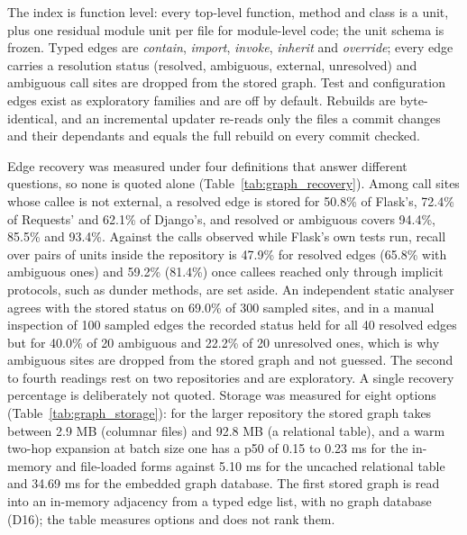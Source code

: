 \documentclass[10pt,twocolumn]{article}
\makeatletter
\renewcommand\section{\@startsection{section}{1}{\z@}{6pt}{3pt}{\normalfont\large\bfseries}}
\renewcommand\paragraph{\@startsection{paragraph}{4}{\z@}{3pt}{-0.5em}{\normalfont\bfseries}}
\makeatother
\begin{document}


\section{System}
\label{sec:system}

\paragraph{Parser and typed graph.} The index is function level: every top-level function, method
and class is a unit, plus one residual module unit per file for module-level code; the unit schema is
frozen. Typed edges are \emph{contain}, \emph{import}, \emph{invoke}, \emph{inherit} and
\emph{override}; every edge carries a resolution status (resolved, ambiguous, external,
unresolved) and ambiguous call sites are dropped from the stored graph. Test and configuration edges
exist as exploratory families and are off by default. Rebuilds are byte-identical, and an
incremental updater re-reads only the files a commit changes and their dependants and equals the
full rebuild on every commit checked.

Edge recovery was measured under four definitions that answer different questions, so none is quoted alone
(Table~\ref{tab:graph_recovery}). Among call sites whose callee is not external, a resolved edge is stored for 50.8\% of Flask's, 72.4\% of Requests'
and 62.1\% of Django's, and resolved or ambiguous covers 94.4\%, 85.5\% and 93.4\%. %
Against the calls observed while Flask's own tests run, recall over pairs of units inside the repository is 47.9\% for resolved edges (65.8\% with ambiguous ones) and
59.2\% (81.4\%) once callees reached only through implicit protocols, such as dunder methods, are set aside. %
An independent static analyser agrees with the stored status on 69.0\% of 300 sampled sites, and in a manual inspection of 100 sampled edges the recorded status held for
all 40 resolved edges but for 40.0\% of 20 ambiguous and 22.2\% of 20 unresolved ones, which is why ambiguous sites are dropped from the stored graph and not guessed. %
The second to fourth readings rest on two repositories and are exploratory. A single recovery percentage is deliberately not quoted.
Storage was measured for eight options (Table~\ref{tab:graph_storage}): for the larger repository the stored graph takes between 2.9 MB (columnar files) and 92.8 MB
(a relational table), and a warm two-hop expansion at batch size one has a p50 of 0.15 to 0.23 ms for the in-memory and file-loaded forms against 5.10 ms for the
uncached relational table and 34.69 ms for the embedded graph database. %
The first stored graph is read into an in-memory adjacency from a typed edge list, with no graph database (D16); the table measures options and does not rank them.
\end{document}

